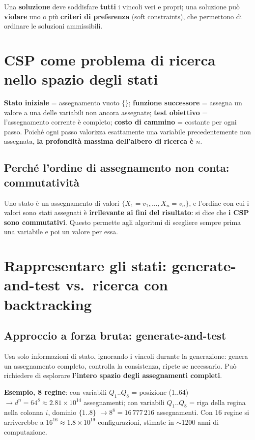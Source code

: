 \documentclass[11pt,a4paper]{report}
\begin{document}
Una \textbf{soluzione} deve soddisfare \textbf{tutti} i vincoli veri e propri; una soluzione può \textbf{violare} uno o più \textbf{criteri di preferenza} (soft constraints), che permettono di ordinare le soluzioni ammissibili.

\section{CSP come problema di ricerca nello spazio degli stati}

\textbf{Stato iniziale} = assegnamento vuoto $\{\}$; \textbf{funzione successore} = assegna un valore a una delle variabili non ancora assegnate; \textbf{test obiettivo} = l'assegnamento corrente è completo; \textbf{costo di cammino} = costante per ogni passo. Poiché ogni passo valorizza esattamente una variabile precedentemente non assegnata, \textbf{la profondità massima dell'albero di ricerca è $n$}.

\subsection*{Perché l'ordine di assegnamento non conta: commutatività}

Uno stato è un assegnamento di valori $\{X_1{=}v_1,\dots,X_n{=}v_n\}$, e l'ordine con cui i valori sono stati assegnati è \textbf{irrilevante ai fini del risultato}: si dice che \textbf{i CSP sono commutativi}. Questo permette agli algoritmi di scegliere sempre prima una variabile e poi un valore per essa.

\section{Rappresentare gli stati: generate-and-test vs.\ ricerca con backtracking}

\subsection*{Approccio a forza bruta: generate-and-test}

Usa solo informazioni di stato, ignorando i vincoli durante la generazione: genera un assegnamento completo, controlla la consistenza, ripete se necessario. Può richiedere di esplorare \textbf{l'intero spazio degli assegnamenti completi}.

\textbf{Esempio, 8 regine}: con variabili $Q_1..Q_8$ = posizione (1..64) $\to d^n = 64^8 \approx 2.81\times 10^{14}$ assegnamenti; con variabili $Q_1..Q_8$ = riga della regina nella colonna $i$, dominio $\{1..8\}$ $\to 8^8 = 16\,777\,216$ assegnamenti. Con 16 regine si arriverebbe a $16^{16}\approx 1.8\times10^{19}$ configurazioni, stimate in $\sim$1200 anni di computazione.
\end{document}
